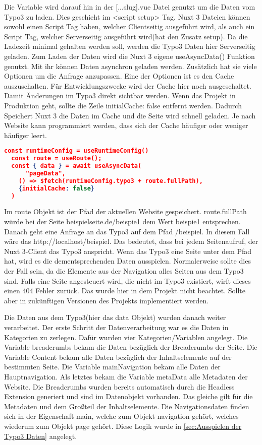 Die Variable wird darauf hin in der [...slug].vue Datei genutzt um die Daten vom Typo3 zu laden. Dies geschieht im <script setup> Tag. Nuxt 3 Dateien können sowohl einen Script Tag haben, welcher Clientseitig ausgeführt wird, als auch ein Script Tag, welcher Serverseitig ausgeführt wird(hat den Zusatz setup). Da die Ladezeit minimal gehalten werden soll, werden die Typo3 Daten hier Serverseitig geladen. Zum Laden der Daten wird die Nuxt 3 eigene useAsyncData() Funktion genutzt. Mit ihr können Daten asynchron geladen werden. Zusätzlich hat sie viele Optionen um die Anfrage anzupassen. Eine der Optionen ist es den Cache auszuschalten. Für Entwicklungszwecke wird der Cache hier noch ausgeschaltet. Damit Änderungen im Typo3 direkt sichtbar werden. Wenn das Projekt in Produktion geht, sollte die Zeile {initialCache: false} entfernt werden. Dadurch Speichert Nuxt 3 die Daten im Cache und die Seite wird schnell geladen. Je nach Website kann programmiert werden, dass sich der Cache häufiger oder weniger häufiger leert.

\begin{lstlisting}[language=json,firstnumber=1]
  const runtimeConfig = useRuntimeConfig()
  const route = useRoute();
  const { data } = await useAsyncData(
      "pageData",
    () => $fetch(runtimeConfig.typo3 + route.fullPath),
    {initialCache: false}
  )
\end{lstlisting}

Im route Objekt ist der Pfad der aktuellen Website gespeichert. route.fullPath würde bei der Seite beispielseite.de/beispie1 dem Wert beispie1 entsprechen. Danach geht eine Anfrage an das Typo3 auf dem Pfad /beispiel. In diesem Fall wäre das http://localhost/beispiel. Das bedeutet, dass bei jedem Seitenaufruf, der Nuxt 3-Client das Typo3 anspricht. Wenn das Typo3 eine Seite unter dem Pfad hat, wird es die dementsprechenden Daten ausspielen. Normalerweise sollte dies der Fall sein, da die Elemente aus der Navigation alles Seiten aus dem Typo3 sind. Falls eine Seite angesteuert wird, die nicht im Typo3 existiert, wirft dieses einen 404 Fehler zurück. Das wurde hier in dem Projekt nicht beachtet. Sollte aber in zukünftigen Versionen des Projekts implementiert werden.

Die Daten aus dem Typo3(hier das data Objekt) wurden danach weiter verarbeitet. Der erste Schritt der Datenverarbeitung war es die Daten in Kategorien zu zerlegen. Dafür wurden vier Kategorien/Variablen angelegt. Die Variable breadcrumbs bekam die Daten bezüglich der Breadcrumbs der Seite. Die Variable Content bekam alle Daten bezüglich der Inhaltselemente auf der bestimmten Seite. Die Variable mainNavigation bekam alle Daten der Hauptnavigation. Als letztes bekam die Variable metaData alle Metadaten der Website. Die Breadcrumbs wurden bereits automatisch durch die Headless Extension generiert und sind im Datenobjekt vorhanden. Das gleiche gilt für die Metadaten und dem Großteil der Inhaltselemente. Die Navigationsdaten finden sich in der Eigenschaft main, welche zum Objekt navigation gehört, welches wiederum zum Objekt page gehört. Diese Logik wurde in \ref{sec:Ausspielen der Typo3 Daten} angelegt.

